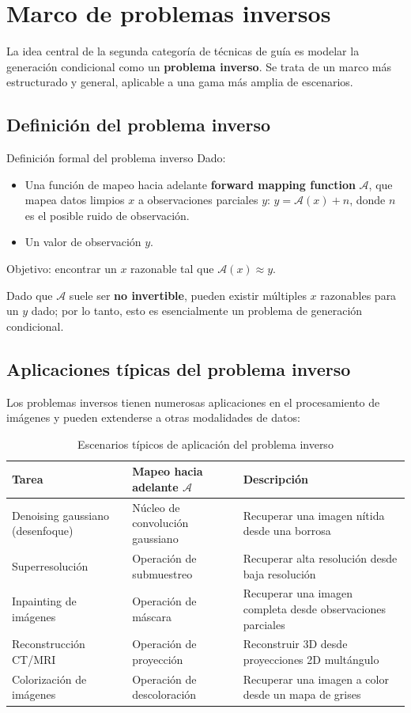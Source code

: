 \section{Marco de problemas inversos}

La idea central de la segunda categoría de técnicas de guía es modelar la generación condicional como un \textbf{problema inverso}. Se trata de un marco más estructurado y general, aplicable a una gama más amplia de escenarios.

\subsection{Definición del problema inverso}

\begin{importantbox}{Definición formal del problema inverso}
Dado:
\begin{itemize}
    \item Una función de mapeo hacia adelante \textbf{forward mapping function} $\mathcal{A}$, que mapea datos limpios $x$ a observaciones parciales $y$: $y = \mathcal{A}(x) + n$, donde $n$ es el posible ruido de observación.
    \item Un valor de observación $y$.
\end{itemize}
Objetivo: encontrar un $x$ razonable tal que $\mathcal{A}(x) \approx y$.

Dado que $\mathcal{A}$ suele ser \textbf{no invertible}, pueden existir múltiples $x$ razonables para un $y$ dado; por lo tanto, esto es esencialmente un problema de generación condicional.
\end{importantbox}

\subsection{Aplicaciones típicas del problema inverso}

Los problemas inversos tienen numerosas aplicaciones en el procesamiento de imágenes y pueden extenderse a otras modalidades de datos:

\begin{table}[H]
\centering
\begin{tabular}{lll}
\toprule
\textbf{Tarea} & \textbf{Mapeo hacia adelante $\mathcal{A}$} & \textbf{Descripción} \\
\midrule
Denoising gaussiano (desenfoque) & Núcleo de convolución gaussiano & Recuperar una imagen nítida desde una borrosa \\
Superresolución & Operación de submuestreo & Recuperar alta resolución desde baja resolución \\
Inpainting de imágenes & Operación de máscara & Recuperar una imagen completa desde observaciones parciales \\
Reconstrucción CT/MRI & Operación de proyección & Reconstruir 3D desde proyecciones 2D multángulo \\
Colorización de imágenes & Operación de descoloración & Recuperar una imagen a color desde un mapa de grises \\
\bottomrule
\end{tabular}
\caption{Escenarios típicos de aplicación del problema inverso}
\end{table}

